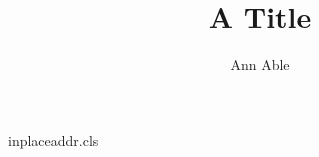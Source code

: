\begin{filecontents*}[overwrite]{inplaceaddr.cls}
\let\@author\@empty\renewcommand\author[2][]{\g@addto@macro\@author{#2 }}
\newcommand\address[2][]{\par{\small\ifx\relax#1\relax\else(#1) \fi #2}\par}
\def\inst#1{\textsuperscript{#1}}
\end{filecontents*}
\documentclass{inplaceaddr}

\title{A Title}
\author{Ann Able}
\address[\inst{1}]{Univ A, Town}
\address[\inst{9}]{Univ Z, Zed}
\section{Intro}
Pre text.
\maketitle
Body.

